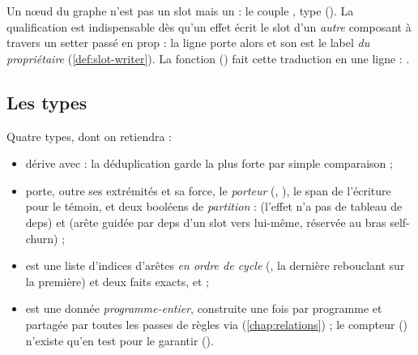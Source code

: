 Un nœud du graphe n'est pas un slot mais un  : le couple
, type 
(). La qualification est indispensable dès qu'un effet écrit
le slot d'un \emph{autre} composant à travers un setter passé en prop : la ligne
 porte alors  et son  est le
label \emph{du propriétaire} (\cref{def:slot-writer}). La fonction 
() fait cette traduction en une ligne :
.

\subsection{Les types}


Quatre types, dont on retiendra :
\begin{itemize}
  \item {} dérive  avec  : la déduplication
        garde \og la plus forte\fg{} par simple comparaison ;
  \item {} porte, outre ses extrémités et sa force, le \emph{porteur}
        (, ), le span de l'écriture pour le témoin, et
        deux booléens de \emph{partition} :  (l'effet n'a pas de tableau de
        deps) et  (arête guidée par deps d'un slot vers lui-même, réservée au
        bras self-churn) ;
  \item {} est une liste d'indices d'arêtes \emph{en ordre de cycle}
        (, la dernière rebouclant sur la première) et
        deux faits exacts,  et  ;
  \item {} est une donnée \emph{programme-entier}, construite une fois par
        programme et partagée par toutes les passes de règles via 
        (\cref{chap:relations}) ; le compteur  ()
        n'existe qu'en test pour le garantir ().
\end{itemize}


